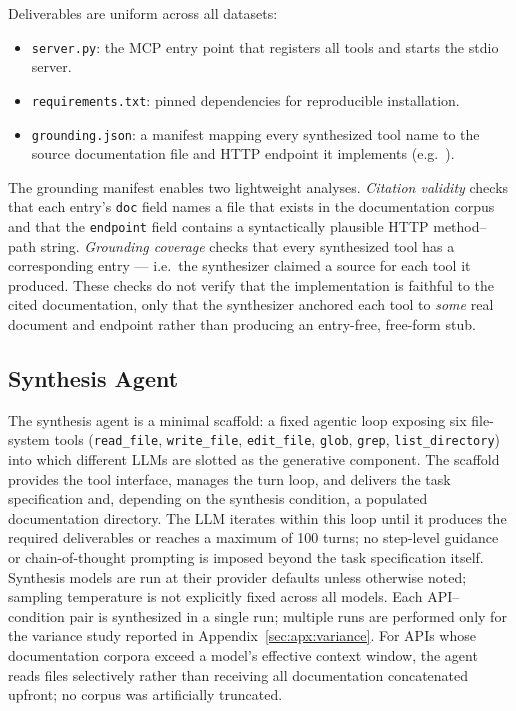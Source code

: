 Deliverables are uniform across all datasets:
\begin{itemize}
  \item \texttt{server.py}: the MCP entry point that registers all tools
    and starts the stdio server.
  \item \texttt{requirements.txt}: pinned dependencies for reproducible
    installation.
  \item \texttt{grounding.json}: a manifest mapping every synthesized tool
    name to the source documentation file and HTTP endpoint it implements
    (e.g.\ ).
\end{itemize}

\noindent
The grounding manifest enables two lightweight analyses. \emph{Citation validity} checks that each entry's \texttt{doc} field names a file that exists in the documentation corpus and that the \texttt{endpoint} field contains a syntactically plausible HTTP method--path string. \emph{Grounding coverage} checks that every synthesized tool has a corresponding entry --- i.e.\ the synthesizer claimed a source for each tool it produced. These checks do not verify that the implementation is faithful to the cited documentation, only that the synthesizer anchored each tool to \emph{some} real document and endpoint rather than producing an entry-free, free-form stub.

\subsection{Synthesis Agent}

The synthesis agent is a minimal scaffold: a fixed agentic loop exposing six file-system tools (\texttt{read\_file}, \texttt{write\_file}, \texttt{edit\_file}, \texttt{glob}, \texttt{grep}, \texttt{list\_directory}) into which different LLMs are slotted as the generative component. The scaffold provides the tool interface, manages the turn loop, and delivers the task specification and, depending on the synthesis condition, a populated documentation directory. The LLM iterates within this loop until it produces the required deliverables or reaches a maximum of 100 turns; no step-level guidance or chain-of-thought prompting is imposed beyond the task specification itself. Synthesis models are run at their provider defaults unless otherwise noted; sampling temperature is not explicitly fixed across all models. Each API--condition pair is synthesized in a single run; multiple runs are performed only for the variance study reported in Appendix~\ref{sec:apx:variance}. For APIs whose documentation corpora exceed a model's effective context window, the agent reads files selectively rather than receiving all documentation concatenated upfront; no corpus was artificially truncated.

